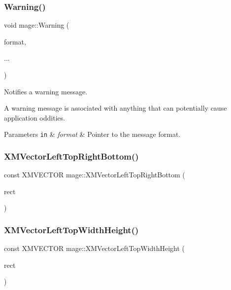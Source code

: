 \subsubsection{\texorpdfstring{Warning()}{Warning()}}
{\footnotesize\ttfamily void mage\+::\+Warning (\begin{DoxyParamCaption}\item[{const char $\ast$}]{format,  }\item[{}]{... }\end{DoxyParamCaption})}

Notifies a warning message.

A warning message is associated with anything that can potentially cause application oddities.


\begin{DoxyParams}[1]{Parameters}
\mbox{\tt in}  & {\em format} & Pointer to the message format. \\
\hline
\end{DoxyParams}
\hypertarget{namespacemage_aa049ddf42f2937d6bc7f730f4eabf57a}{}\label{namespacemage_aa049ddf42f2937d6bc7f730f4eabf57a} 
\subsubsection{\texorpdfstring{X\+M\+Vector\+Left\+Top\+Right\+Bottom()}{XMVectorLeftTopRightBottom()}}
{\footnotesize\ttfamily const X\+M\+V\+E\+C\+T\+OR mage\+::\+X\+M\+Vector\+Left\+Top\+Right\+Bottom (\begin{DoxyParamCaption}\item[{const R\+E\+CT \&}]{rect }\end{DoxyParamCaption})}

\hypertarget{namespacemage_a21b11fa85a84f903e3bd4678bf655270}{}\label{namespacemage_a21b11fa85a84f903e3bd4678bf655270} 
\subsubsection{\texorpdfstring{X\+M\+Vector\+Left\+Top\+Width\+Height()}{XMVectorLeftTopWidthHeight()}}
{\footnotesize\ttfamily const X\+M\+V\+E\+C\+T\+OR mage\+::\+X\+M\+Vector\+Left\+Top\+Width\+Height (\begin{DoxyParamCaption}\item[{const R\+E\+CT \&}]{rect }\end{DoxyParamCaption})}



